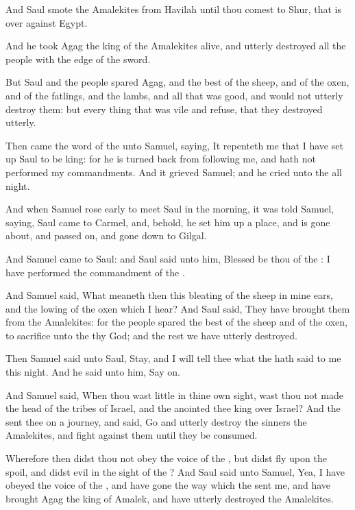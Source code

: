 \verse And Saul smote the Amalekites from Havilah until thou comest to Shur, that is over against Egypt.

\verse And he took Agag the king of the Amalekites alive, and utterly destroyed all the people with the edge of the sword.

\verse But Saul and the people spared Agag, and the best of the sheep, and of the oxen, and of the fatlings, and the lambs, and all that was good, and would not utterly destroy them: but every thing that was vile and refuse, that they destroyed utterly.

\verse Then came the word of the \LORD unto Samuel, saying, \verse It repenteth me that I have set up Saul to be king: for he is turned back from following me, and hath not performed my commandments. And it grieved Samuel; and he cried unto the \LORD all night.

\verse And when Samuel rose early to meet Saul in the morning, it was told Samuel, saying, Saul came to Carmel, and, behold, he set him up a place, and is gone about, and passed on, and gone down to Gilgal.

\verse And Samuel came to Saul: and Saul said unto him, Blessed be thou of the \LORD: I have performed the commandment of the \LORD.

\verse And Samuel said, What meaneth then this bleating of the sheep in mine ears, and the lowing of the oxen which I hear?  \verse And Saul said, They have brought them from the Amalekites: for the people spared the best of the sheep and of the oxen, to sacrifice unto the \LORD thy God; and the rest we have utterly destroyed.

\verse Then Samuel said unto Saul, Stay, and I will tell thee what the \LORD hath said to me this night. And he said unto him, Say on.

\verse And Samuel said, When thou wast little in thine own sight, wast thou not made the head of the tribes of Israel, and the \LORD anointed thee king over Israel?  \verse And the \LORD sent thee on a journey, and said, Go and utterly destroy the sinners the Amalekites, and fight against them until they be consumed.

\verse Wherefore then didst thou not obey the voice of the \LORD, but didst fly upon the spoil, and didst evil in the sight of the \LORD?  \verse And Saul said unto Samuel, Yea, I have obeyed the voice of the \LORD, and have gone the way which the \LORD sent me, and have brought Agag the king of Amalek, and have utterly destroyed the Amalekites.

